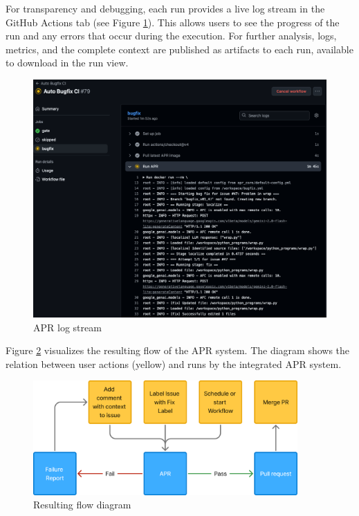 
For transparency and debugging, each run provides a live log stream in the GitHub Actions tab (see Figure \ref{fig:log-stream}). This allows users to see the progress of the run and any errors that occur during the execution. For further analysis, logs, metrics, and the complete context are published as artifacts to each run, available to download in the run view.
\begin{figure}[H]
    \centering
    \includegraphics[width=1\textwidth]{images/workflow/logs.png}
    \caption{APR log stream}
    \label{fig:log-stream}
\end{figure}

Figure \ref{fig:flow} visualizes the resulting flow of the APR system. The diagram shows the relation between user actions (yellow) and runs by the integrated APR system.

\begin{figure}[H]
    \centering
    \includegraphics[width=0.9\textwidth]{images/flowcharts/flowresult.png}
    \caption{Resulting flow diagram}
    \label{fig:flow}
\end{figure}

